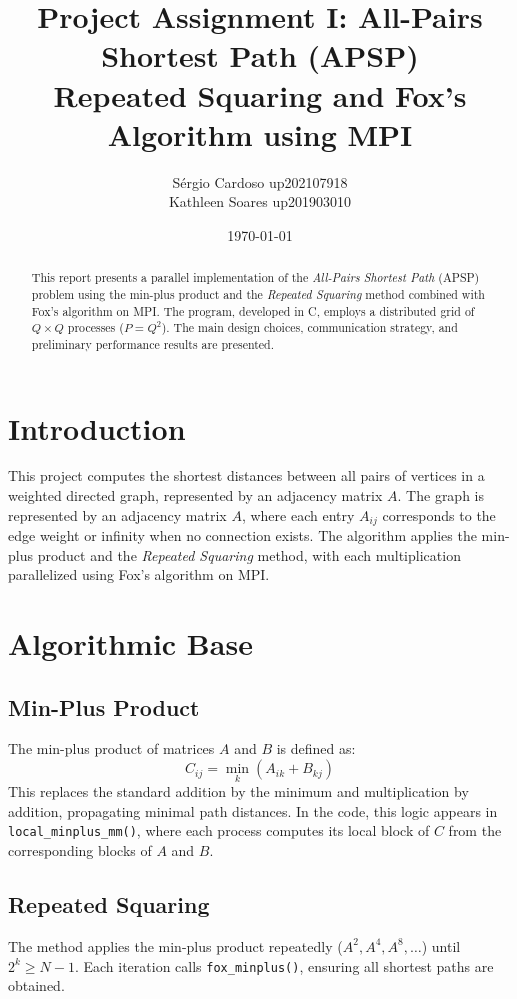 \documentclass[10pt,a4paper]{article}
\title{\textbf{Project Assignment I: All-Pairs Shortest Path (APSP)}\\
\large Repeated Squaring and Fox’s Algorithm using MPI}
\author{Sérgio Cardoso up202107918 \\ Kathleen Soares up201903010}
\date{\today}
\begin{document}
\maketitle

\begin{abstract}
This report presents a parallel implementation of the \emph{All-Pairs Shortest Path} (APSP) problem using the min-plus product and the \emph{Repeated Squaring} method combined with Fox's algorithm on MPI. The program, developed in C, employs a distributed grid of \(Q \times Q\) processes (\(P = Q^2\)). The main design choices, communication strategy, and preliminary performance results are presented.
\end{abstract}

\section{Introduction}
This project computes the shortest distances between all pairs of vertices in a weighted directed graph, represented by an adjacency matrix \(A\). The graph is represented by an adjacency matrix \(A\), where each entry \(A_{ij}\) corresponds to the edge weight or infinity when no connection exists.
 The algorithm applies the min-plus product and the \emph{Repeated Squaring} method, with each multiplication parallelized using Fox’s algorithm on MPI.

\section{Algorithmic Base}

\subsection{Min-Plus Product}
The min-plus product of matrices \(A\) and \(B\) is defined as:
\[
C_{ij} = \min_k (A_{ik} + B_{kj})
\]
This replaces the standard addition by the minimum and multiplication by addition, propagating minimal path distances. In the code, this logic appears in \texttt{local\_minplus\_mm()}, where each process computes its local block of \(C\) from the corresponding blocks of \(A\) and \(B\).

\subsection{Repeated Squaring}
The method applies the min-plus product repeatedly (\(A^2, A^4, A^8, \ldots\)) until \(2^k \ge N-1\). Each iteration calls \texttt{fox\_minplus()}, ensuring all shortest paths are obtained.
\end{document}
